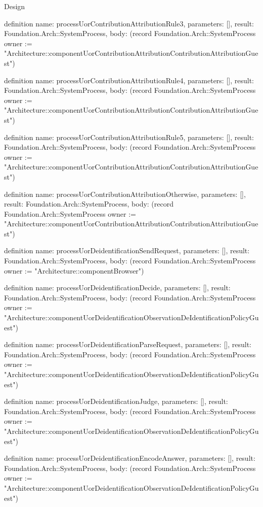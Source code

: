 \begin{lexlean}{Design}
\begin{semanticmodule}
definition{
  name: processUorContributionAttributionRule3,
  parameters: [],
  result: Foundation.Arch::SystemProcess,
  body: (record Foundation.Arch::SystemProcess {owner := "Architecture::componentUorContributionAttributionContributionAttributionGuest"})
}

definition{
  name: processUorContributionAttributionRule4,
  parameters: [],
  result: Foundation.Arch::SystemProcess,
  body: (record Foundation.Arch::SystemProcess {owner := "Architecture::componentUorContributionAttributionContributionAttributionGuest"})
}

definition{
  name: processUorContributionAttributionRule5,
  parameters: [],
  result: Foundation.Arch::SystemProcess,
  body: (record Foundation.Arch::SystemProcess {owner := "Architecture::componentUorContributionAttributionContributionAttributionGuest"})
}

definition{
  name: processUorContributionAttributionOtherwise,
  parameters: [],
  result: Foundation.Arch::SystemProcess,
  body: (record Foundation.Arch::SystemProcess {owner := "Architecture::componentUorContributionAttributionContributionAttributionGuest"})
}

definition{
  name: processUorDeidentificationSendRequest,
  parameters: [],
  result: Foundation.Arch::SystemProcess,
  body: (record Foundation.Arch::SystemProcess {owner := "Architecture::componentBrowser"})
}

definition{
  name: processUorDeidentificationDecide,
  parameters: [],
  result: Foundation.Arch::SystemProcess,
  body: (record Foundation.Arch::SystemProcess {owner := "Architecture::componentUorDeidentificationObservationDeIdentificationPolicyGuest"})
}

definition{
  name: processUorDeidentificationParseRequest,
  parameters: [],
  result: Foundation.Arch::SystemProcess,
  body: (record Foundation.Arch::SystemProcess {owner := "Architecture::componentUorDeidentificationObservationDeIdentificationPolicyGuest"})
}

definition{
  name: processUorDeidentificationJudge,
  parameters: [],
  result: Foundation.Arch::SystemProcess,
  body: (record Foundation.Arch::SystemProcess {owner := "Architecture::componentUorDeidentificationObservationDeIdentificationPolicyGuest"})
}

definition{
  name: processUorDeidentificationEncodeAnswer,
  parameters: [],
  result: Foundation.Arch::SystemProcess,
  body: (record Foundation.Arch::SystemProcess {owner := "Architecture::componentUorDeidentificationObservationDeIdentificationPolicyGuest"})
}


\end{semanticmodule}
\end{lexlean}
